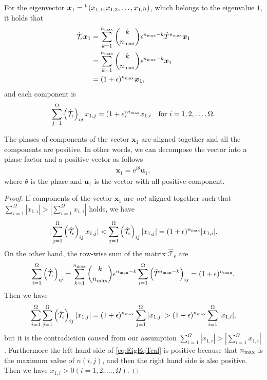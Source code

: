 For the eigenvector $\bm{x}_{1}={}^{\rm t}\left(x_{1,1},x_{1,2},\dots,x_{1,\Omega}\right)$, which belongs to the eigenvalue $1$, it holds that
\begin{align}
\hat{\mathcal{T}}_{\epsilon}\bm{x}_{1} &= \sum_{k=1}^{n_{\rm max}}\binom{k}{n_{\rm max}}\epsilon^{n_{\rm max}-k}\hat{T}^{n_{\rm max}}\bm{x}_{1}\\
&= \sum_{k=1}^{n_{\rm max}}\binom{k}{n_{\rm max}}\epsilon^{n_{\rm max}-k}\bm{x}_{1}\\
&= (1+\epsilon)^{n_{\rm max}}\bm{x}_{1},
\end{align}
and each component is
\begin{align}
\sum_{j=1}^{\Omega}\left(\hat{\mathcal{T}}_{\epsilon}\right)_{ij}x_{1,j} = (1+\epsilon)^{n_{\rm max}}x_{1,i}\quad\text{for $i=1,2,\dots,\Omega$}\label{eq:EigEqTcal}.
\end{align}

\begin{theorem}
	The phases of components of the vector $\bm{x}_{1}$ are aligned together and all the components are positive. In other words, we can decompose the vector into a phase factor and a positive vector as follows
	\begin{align}
	\bm{x}_{1} = \mathrm{e}^{i\theta}\bm{u}_{1},
	\end{align}
	where $\theta$ is the phase and $\bm{u}_{1}$ is the vector with all positive component.
\end{theorem}

\begin{proof}
	If components of the vector $\bm{x}_{1}$ are \textit{not} aligned together such that $\sum_{i=1}^{\Omega}|x_{1,i}|>|\sum_{i=1}^{\Omega}x_{1,i}|$ holds, we have
	\begin{align}
	|\sum_{j=1}^{\Omega}\left(\hat{\mathcal{T}}_{\epsilon}\right)_{ij}x_{1,j}| < \sum_{j=1}^{\Omega}\left(\hat{\mathcal{T}}_{\epsilon}\right)_{ij}|x_{1,j}| = (1+\epsilon)^{n_{\rm max}}|x_{1,i}|.
	\end{align}
	On the other hand, the row-wise sum of the matrix $\hat{\mathcal{T}}_{\epsilon}$ are
	\begin{align}
	\sum_{i=1}^{\Omega}\left(\hat{\mathcal{T}}_{\epsilon}\right)_{ij} = \sum_{k=1}^{n_{\rm max}}\binom{k}{n_{\rm max}}\epsilon^{n_{\rm max}-k}\sum_{i=1}^{\Omega}\left(\hat{T}^{n_{\rm max}-k}\right)_{ij} = (1+\epsilon)^{n_{\rm max}}.
	\end{align}
	Then we have
	\begin{align}
	\sum_{i=1}^{\Omega}\sum_{j=1}^{\Omega}\left(\hat{\mathcal{T}}_{\epsilon}\right)_{ij}|x_{1,j}| = (1+\epsilon)^{n_{\rm max}}\sum_{j=1}^{\Omega}|x_{1,j}| > (1+\epsilon)^{n_{\rm max}}\sum_{i=1}^{\Omega}|x_{1,i}|,
	\end{align}
	but it is the contradiction caused from our assumption $\sum_{i=1}^{\Omega}|x_{1,i}|>|\sum_{i=1}^{\Omega}x_{1,i}|$. Furthermore the left hand side of \eqref{eq:EigEqTcal} is positive because that $n_{\rm max}$ is the maximum value of $n(i,j)$, and then the right hand side is also positive. Then we have $x_{1,i}>0(i=1,2,\dots,\Omega)$.
\end{proof}

